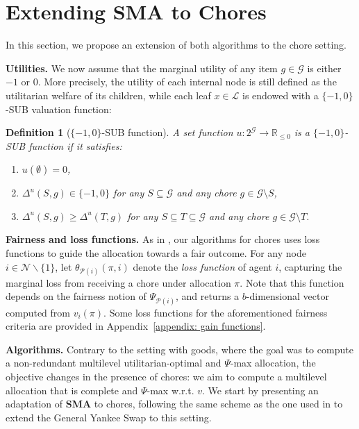 \documentclass[]{article}
\newtheorem{definition}{Definition}
\newcommand{\nodes}{\mathcal{N}}
\newcommand{\items}{\mathcal{G}}
\newcommand{\leaves}{\mathcal{L}}
\begin{document}
\section{Extending SMA to Chores} \label{appendix: chores}

In this section, we propose an extension of both algorithms to the chore setting.

\medskip 

\noindent \textbf{Utilities.} We now assume that the marginal utility of any item $g \in \items$ is either $-1$ or $0$. More precisely, the utility of each internal node is still defined as the utilitarian welfare of its children, while each leaf $x \in \leaves$ is endowed with a $\{-1,0\}$-SUB valuation function:


\begin{definition}[$\{-1, 0\}$-SUB function]
    A set function $u: 2^\items \rightarrow \mathbb{R}_{\leq 0}$ is a $\{-1, 0\}$-SUB function if it satisfies:
    \begin{enumerate}
        \item $u(\emptyset) = 0$,
        \item $\Delta^u(S, g) \in \{-1, 0\}$ for any $S \subseteq \items$ and any chore $g \in \items \setminus S$,
        \item $\Delta^u(S, g) \geq \Delta^u(T, g)$ for any $S \subseteq T \subseteq \items$ and any chore $g \in \items \setminus T$.
    \end{enumerate}
\end{definition}

\noindent \textbf{Fairness and loss functions.} As in \cite{Viswanathan_Zick2023b}, our algorithms for chores uses loss functions to guide the allocation towards a fair outcome. For any node $i\in \nodes \backslash\{1\}$, let $\theta_{\mathcal{P}(i)}(\pi, i)$ denote the {\em loss function} of agent $i$, capturing the marginal loss from receiving a chore under allocation $\pi$. Note that this function depends on the fairness notion of $\Psi_{\mathcal{P}(i)}$, and returns a $b$-dimensional vector computed from $v_i(\pi)$. Some loss functions for the aforementioned fairness criteria are provided in Appendix~\ref{appendix: gain functions}.

\medskip

\noindent \textbf{Algorithms.} Contrary to the setting with goods, where the goal was to compute a non-redundant multilevel utilitarian-optimal and $\Psi$-max allocation, the objective changes in the presence of chores: we aim to compute a multilevel allocation that is complete and $\Psi$-max w.r.t. $v$. We start by presenting an adaptation of \textbf{SMA} to chores, following the same scheme as the one used in \cite{Viswanathan_Zick2023b} to extend the General Yankee Swap to this setting.
\end{document}
